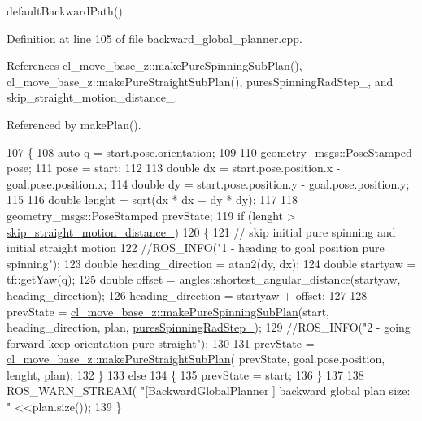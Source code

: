 default\+Backward\+Path() 

Definition at line 105 of file backward\+\_\+global\+\_\+planner.\+cpp.



References cl\+\_\+move\+\_\+base\+\_\+z\+::make\+Pure\+Spinning\+Sub\+Plan(), cl\+\_\+move\+\_\+base\+\_\+z\+::make\+Pure\+Straight\+Sub\+Plan(), pures\+Spinning\+Rad\+Step\+\_\+, and skip\+\_\+straight\+\_\+motion\+\_\+distance\+\_\+.



Referenced by make\+Plan().


\begin{DoxyCode}
107 \{
108     \textcolor{keyword}{auto} q = start.pose.orientation;
109 
110     geometry\_msgs::PoseStamped pose;
111     pose = start;
112     
113     \textcolor{keywordtype}{double} dx = start.pose.position.x - goal.pose.position.x;
114     \textcolor{keywordtype}{double} dy = start.pose.position.y - goal.pose.position.y;
115 
116     \textcolor{keywordtype}{double} lenght = sqrt(dx * dx + dy * dy);
117 
118     geometry\_msgs::PoseStamped prevState;
119     \textcolor{keywordflow}{if} (lenght > \hyperlink{classcl__move__base__z_1_1backward__global__planner_1_1BackwardGlobalPlanner_a045290b931b816b84ced2cfb6c39fcce}{skip\_straight\_motion\_distance\_})
120     \{
121         \textcolor{comment}{// skip initial pure spinning and initial straight motion}
122         \textcolor{comment}{//ROS\_INFO("1 - heading to goal position pure spinning");}
123         \textcolor{keywordtype}{double} heading\_direction = atan2(dy, dx);
124         \textcolor{keywordtype}{double} startyaw = tf::getYaw(q);
125         \textcolor{keywordtype}{double} offset = angles::shortest\_angular\_distance(startyaw, heading\_direction);
126         heading\_direction = startyaw + offset;
127 
128         prevState = \hyperlink{namespacecl__move__base__z_ac774e138510eb7b5e0015be1f7709e19}{cl\_move\_base\_z::makePureSpinningSubPlan}(start, 
      heading\_direction, plan, \hyperlink{classcl__move__base__z_1_1backward__global__planner_1_1BackwardGlobalPlanner_a066d160f78bebee9fc5b5251016f1cd0}{puresSpinningRadStep\_});
129         \textcolor{comment}{//ROS\_INFO("2 - going forward keep orientation pure straight");}
130 
131         prevState = \hyperlink{namespacecl__move__base__z_a1d6998cc28a1847906272f2bf92bacc8}{cl\_move\_base\_z::makePureStraightSubPlan}(
      prevState, goal.pose.position, lenght, plan);
132     \}
133     \textcolor{keywordflow}{else}
134     \{
135         prevState = start;
136     \}
137 
138     ROS\_WARN\_STREAM( \textcolor{stringliteral}{"[BackwardGlobalPlanner ] backward global plan size:  "} <<plan.size());
139 \}
\end{DoxyCode}

